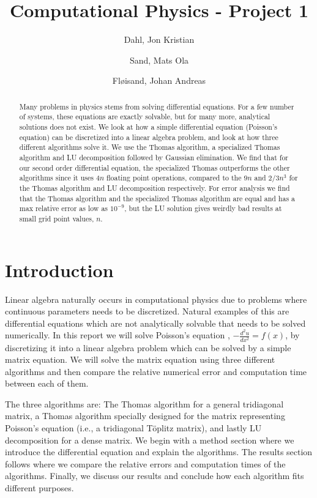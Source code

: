 \documentclass{emulateapj}
\begin{document}
\title{Computational Physics - Project 1}

\author{
  Dahl, Jon Kristian \\
  \and
  Sand, Mats Ola \\
  \and
  Fløisand, Johan Andreas \\
}

\begin{abstract}
Many problems in physics stems from solving differential equations. For a few number of systems, these equations are exactly solvable, but for many more, analytical solutions does not exist. We look at how a simple differential equation (Poisson's equation) can be discretized into a linear algebra problem, and look at how three different algorithms solve it. We use the Thomas algorithm, a specialized Thomas algorithm and LU decomposition followed by Gaussian elimination. We find that for our second order differential equation, the specialized Thomas outperforms the other algorithms since it uses $4n$ floating point operations, compared to the $9n$ and $2/3n^3$ for the Thomas algorithm and LU decomposition respectively. For error analysis we find that the Thomas algorithm and the specialized Thomas algorithm are equal and has a max relative error as low as $10^{-9}$, but the LU solution gives weirdly bad results at small grid point values, $n$.
\end{abstract}

\section{Introduction}
    Linear algebra naturally occurs in computational physics due to problems where continuous parameters needs to be discretized. Natural examples of this are differential equations which are not analytically solvable that needs to be solved numerically. In this report we will solve Poisson's equation \cite[Chapter 13]{matmet}, \(-\frac{d^2u}{dx^2} = f(x)\), by discretizing it into a linear algebra problem which can be solved by a simple matrix equation. We will solve the matrix equation using three different algorithms and then compare the relative numerical error and computation time between each of them.
    
    The three algorithms are: The Thomas algorithm for a general tridiagonal matrix, a Thomas algorithm specially designed for the matrix representing Poisson's equation (i.e., a tridiagonal T\"{o}plitz matrix), and lastly LU decomposition for a dense matrix.
    \newline
    \newline
    We begin with a method section where we introduce the differential equation and explain the algorithms. The results section follows where we compare the relative errors and computation times of the algorithms. Finally, we discuss our results and conclude how each algorithm fits different purposes.
    
\end{document}
